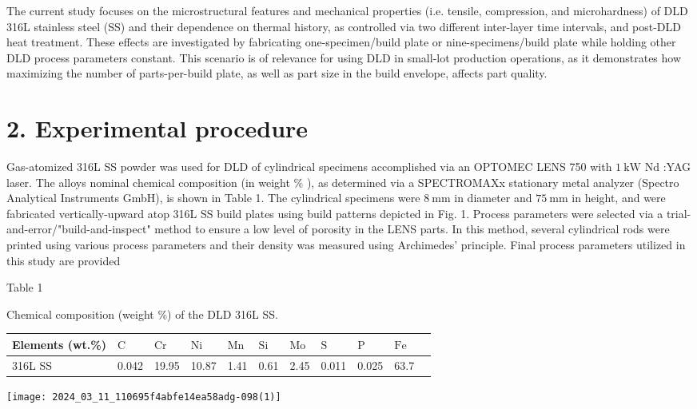 \documentclass[10pt]{article}
\begin{document}
The current study focuses on the microstructural features and mechanical properties (i.e. tensile, compression, and microhardness) of DLD 316L stainless steel (SS) and their dependence on thermal history, as controlled via two different inter-layer time intervals, and post-DLD heat treatment. These effects are investigated by fabricating one-specimen/build plate or nine-specimens/build plate while holding other DLD process parameters constant. This scenario is of relevance for using DLD in small-lot production operations, as it demonstrates how maximizing the number of parts-per-build plate, as well as part size in the build envelope, affects part quality.

\section*{2. Experimental procedure}
Gas-atomized 316L SS powder was used for DLD of cylindrical specimens accomplished via an OPTOMEC LENS 750 with $1 \mathrm{~kW}$ $\mathrm{Nd}$ :YAG laser. The alloys nominal chemical composition (in weight $\%$ ), as determined via a SPECTROMAXx stationary metal analyzer (Spectro Analytical Instruments GmbH), is shown in Table 1. The cylindrical specimens were $8 \mathrm{~mm}$ in diameter and $75 \mathrm{~mm}$ in height, and were fabricated vertically-upward atop 316L SS build plates using build patterns depicted in Fig. 1. Process parameters were selected via a trial-and-error/"build-and-inspect" method to ensure a low level of porosity in the LENS parts. In this method, several cylindrical rods were printed using various process parameters and their density was measured using Archimedes' principle. Final process parameters utilized in this study are provided

Table 1

Chemical composition (weight \%) of the DLD 316L SS.

\begin{center}
\begin{tabular}{lllllllllll}
\hline
Elements (wt.\%) & $\mathrm{C}$ & $\mathrm{Cr}$ & $\mathrm{Ni}$ & $\mathrm{Mn}$ & $\mathrm{Si}$ & $\mathrm{Mo}$ & $\mathrm{S}$ & $\mathrm{P}$ & $\mathrm{Fe}$ \\
\hline
316L SS & 0.042 & 19.95 & 10.87 & 1.41 & 0.61 & 2.45 & 0.011 & 0.025 & 63.7 \\
\hline
\end{tabular}
\end{center}

\begin{center}
\texttt{[image: 2024\_03\_11\_110695f4abfe14ea58adg-098(1)]}
\end{center}
\end{document}
